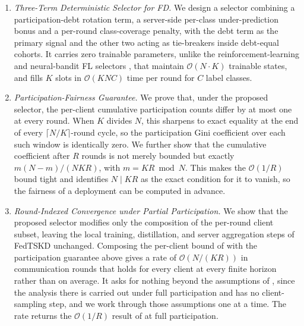 \documentclass[journal]{IEEEtran}
\newcommand{\rev}[1]{{\color{blue}#1}}
\begin{document}
\begin{enumerate}
    \item \textit{Three-Term Deterministic Selector for FD.} We design a selector combining a participation-debt rotation term, a server-side per-class under-prediction bonus and a per-round class-coverage penalty, with the debt term as the primary signal and the other two acting as tie-breakers inside debt-equal cohorts. It carries zero trainable parameters, unlike the reinforcement-learning and neural-bandit FL selectors \rev{\cite{kazemi2026robust}, \cite{xia2020mab}} that maintain $\mathcal{O}(N\cdot K)$ trainable states, and fills $K$ slots in $\mathcal{O}(KNC)$ time per round for $C$ label classes.

    \item \textit{Participation-Fairness Guarantee.} We prove that, under the proposed selector, the per-client cumulative participation counts differ by at most one at every round. When $K$ divides $N$, this sharpens to exact equality at the end of every $\lceil N/K \rceil$-round cycle, so the participation Gini coefficient over each such window is identically zero. \rev{We further show that the cumulative coefficient after $R$ rounds is not merely bounded but exactly $m(N-m)/(NKR)$, with $m = KR \bmod N$. This makes the $\mathcal{O}(1/R)$ bound tight and identifies $N \mid KR$ as the exact condition for it to vanish, so the fairness of a deployment can be computed in advance.}

    \item \textit{\rev{Round-Indexed Convergence under Partial Participation.}} We show that the proposed selector modifies only the composition of the per-round client subset, leaving the local training, distillation, and server aggregation steps of FedTSKD \cite{mu2024fedtskd} unchanged. \rev{Composing the per-client bound of \cite{mu2024fedtskd} with the participation guarantee above gives a rate of $\mathcal{O}(N/(KR))$ in communication rounds that holds for every client at every finite horizon rather than on average. It asks for nothing beyond the assumptions of \cite{mu2024fedtskd}, since the analysis there is carried out under full participation and has no client-sampling step, and we work through those assumptions one at a time. The rate returns the $\mathcal{O}(1/R)$ result of \cite{mu2024fedtskd} at full participation.}


\end{enumerate}
\end{document}

